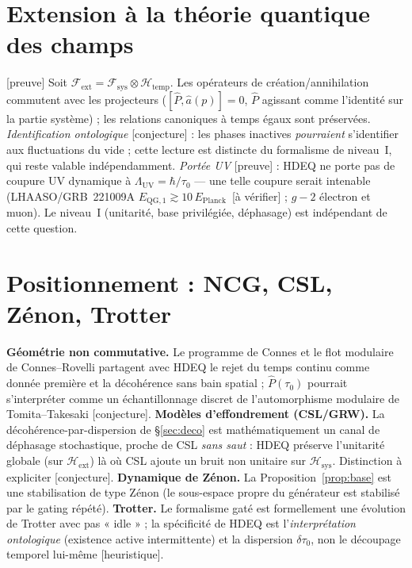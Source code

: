 \documentclass[11pt,a4paper]{article}
\newcommand{\Hext}{\mathcal{H}_{\mathrm{ext}}}
\newcommand{\Hsys}{\mathcal{H}_{\mathrm{sys}}}
\newcommand{\Htemp}{\mathcal{H}_{\mathrm{temp}}}
\newcommand{\statut}[1]{{\footnotesize\textsf{[#1]}}}
\theoremstyle{plain}
\theoremstyle{definition}
\theoremstyle{remark}
\begin{document}
\section{Extension \`a la th\'eorie quantique des champs}
\statut{preuve} Soit $\mathcal{F}_{\mathrm{ext}}=\mathcal{F}_{\mathrm{sys}}\otimes\Htemp$.
Les op\'erateurs de cr\'eation/annihilation commutent avec les projecteurs
($[\hat P,\hat a(p)]=0$, $\hat P$ agissant comme l'identit\'e sur la partie syst\`eme) ;
les relations canoniques \`a temps \'egaux sont pr\'eserv\'ees.
\emph{Identification ontologique} \statut{conjecture} : les phases inactives
\emph{pourraient} s'identifier aux fluctuations du vide ; cette lecture est distincte du
formalisme de niveau~I, qui reste valable ind\'ependamment.
\emph{Port\'ee UV} \statut{preuve} : HDEQ ne porte pas de coupure UV dynamique \`a
$\Lambda_{\mathrm{UV}}=\hbar/\tau_0$ --- une telle coupure serait intenable
(LHAASO/GRB~221009A $E_{\mathrm{QG},1}\gtrsim10\,E_{\mathrm{Planck}}$~\statut{\`a v\'erifier} ;
$g-2$ \'electron et muon). Le niveau~I (unitarit\'e, base privil\'egi\'ee, d\'ephasage) est
ind\'ependant de cette question.

\section{Positionnement : NCG, CSL, Zénon, Trotter}\label{sec:pos}
\textbf{G\'eom\'etrie non commutative.} Le programme de Connes et le flot modulaire de
Connes--Rovelli partagent avec HDEQ le rejet du temps continu comme donn\'ee premi\`ere
et la d\'ecoh\'erence sans bain spatial ; $\hat P(\tau_0)$ pourrait s'interpr\'eter comme
un \'echantillonnage discret de l'automorphisme modulaire de Tomita--Takesaki
\statut{conjecture}.
\textbf{Mod\`eles d'effondrement (CSL/GRW).} La d\'ecoh\'erence-par-dispersion de
\S\ref{sec:deco} est math\'ematiquement un canal de d\'ephasage stochastique, proche de
CSL \emph{sans saut} : HDEQ pr\'eserve l'unitarit\'e globale (sur $\Hext$) l\`a o\`u CSL
ajoute un bruit non unitaire sur $\Hsys$. Distinction \`a expliciter \statut{conjecture}.
\textbf{Dynamique de Zénon.} La Proposition~\ref{prop:base} est une stabilisation de
type Zénon (le sous-espace propre du g\'en\'erateur est stabilis\'e par le gating r\'ep\'et\'e).
\textbf{Trotter.} Le formalisme gat\'e est formellement une \'evolution de Trotter avec
pas « idle » ; la sp\'ecificit\'e de HDEQ est l'\emph{interpr\'etation ontologique} (existence
active intermittente) et la dispersion $\delta\tau_0$, non le d\'ecoupage temporel
lui-m\^eme \statut{heuristique}.
\end{document}
